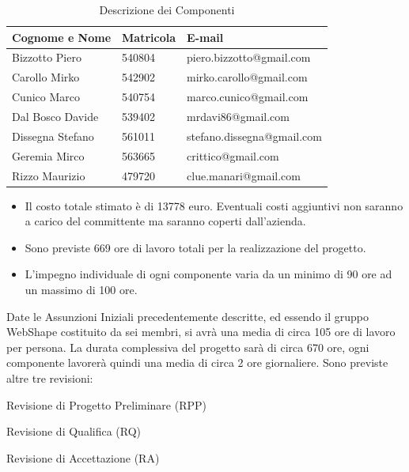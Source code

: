 \begin{table}[h]
	\begin{center}
		  \begin{tabular}{|p{}|l|l|}
		 \hline 
		 \textbf{Cognome e Nome} & \textbf{Matricola} & \textbf{E-mail}\\
		 \hline
		Bizzotto Piero & 540804 & piero.bizzotto@gmail.com \\
		\hline
		Carollo Mirko & 542902 & mirko.carollo@gmail.com\\
		\hline
		Cunico Marco & 540754 & marco.cunico@gmail.com\\
		\hline
		Dal Bosco Davide & 539402 & mrdavi86@gmail.com\\
		\hline
		Dissegna Stefano & 561011 & stefano.dissegna@gmail.com \\
		\hline
		Geremia Mirco & 563665 & crittico@gmail.com\\
		\hline
		Rizzo Maurizio & 479720 & clue.manari@gmail.com\\
		\hline
		\end{tabular}
	\caption{Descrizione dei Componenti} 
	\label{tab:tabella_componenti}
	\end{center}	
\end{table}


\begin{itemize}
\item Il costo totale stimato \`e di 13778 euro. Eventuali costi aggiuntivi non saranno a carico del committente ma saranno coperti dall'azienda.
\item Sono previste 669 ore di lavoro totali per la realizzazione del progetto.
\item L'impegno individuale di ogni componente varia da un minimo di 90 ore ad un massimo di 100 ore.
\end{itemize}


Date le Assunzioni Iniziali precedentemente descritte, ed essendo il gruppo WebShape costituito da sei membri, si avr\`a una media di circa 105 ore di lavoro per persona. La durata complessiva del progetto sar\`a di circa 670 ore, ogni componente lavorer\`a quindi una media di circa 2 ore giornaliere. Sono previste altre tre revisioni:
\begin{elenconumerato}{\normindent}
				\item Revisione di Progetto Preliminare (RPP)
				\item Revisione di Qualifica (RQ)
				\item Revisione di Accettazione (RA)
			\end{elenconumerato}

